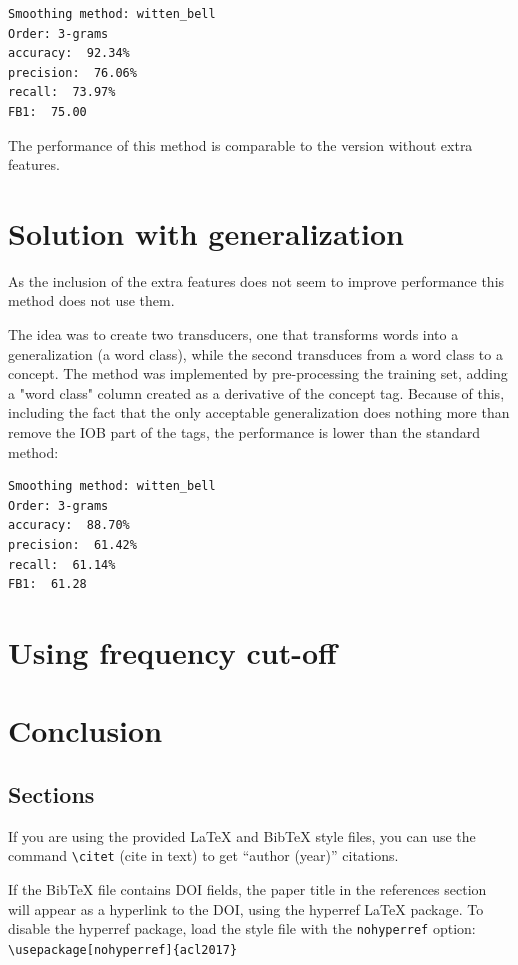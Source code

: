\documentclass[11pt,a4paper]{article}
\begin{document}
\begin{verbatim}
Smoothing method: witten_bell
Order: 3-grams
accuracy:  92.34%
precision:  76.06%
recall:  73.97%
FB1:  75.00
\end{verbatim}

The performance of this method is comparable to the version without extra features.


\section{Solution with generalization}
As the inclusion of the extra features does not seem to improve performance this method does not use them.

The idea was to create two transducers, one that transforms words into a generalization (a word class), while the second transduces from a word class to a concept. The method was implemented by pre-processing the training set, adding a "word class" column created as a derivative of the concept tag. Because of this, including the fact that the only acceptable generalization does nothing more than remove the IOB part of the tags, the performance is lower than the standard method:
\begin{verbatim}
Smoothing method: witten_bell
Order: 3-grams
accuracy:  88.70%
precision:  61.42%
recall:  61.14%
FB1:  61.28
\end{verbatim}

\section{Using frequency cut-off}


\section{Conclusion}



\subsection{Sections}

If you are using the provided \LaTeX{} and Bib\TeX{} style files, you
can use the command \verb|\citet| (cite in text)
to get ``author (year)'' citations.

If the Bib\TeX{} file contains DOI fields, the paper
title in the references section will appear as a hyperlink
to the DOI, using the hyperref \LaTeX{} package.
To disable the hyperref package, load the style file
with the \verb|nohyperref| option:
\verb|\usepackage[nohyperref]{acl2017}|
\end{document}

